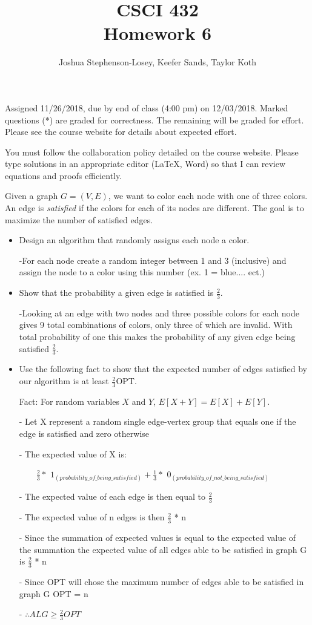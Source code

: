 \documentclass[12pt]{article}
\author{Joshua Stephenson-Losey,
Keefer Sands,
Taylor Koth}
\newenvironment{problem}[2][Problem]
{\begin{trivlist}
\item[\hskip \labelsep {\bfseries #1}\hskip \labelsep {\bfseries #2.}]}{\end{trivlist}}
\begin{document}
 
\title{CSCI 432\\Homework 6}
\date{}
\maketitle

Assigned 11/26/2018, due by end of class (4:00 pm) on 12/03/2018. Marked questions (*) are graded for correctness. The remaining will be graded for effort. Please see the course website for details about expected effort.

You must follow the collaboration policy detailed on the course website. Please type solutions in an appropriate editor (\LaTeX, Word) so that I can review equations and proofs efficiently. 

\begin{problem}{1*}
Given a graph $G=(V,E)$, we want to color each node with one of three colors. An edge is \textit{satisfied} if the colors for each of its nodes are different. The goal is to maximize the number of satisfied edges.

\begin{itemize}
\item Design an algorithm that randomly assigns each node a color.

-For each node create a random integer between 1 and 3 (inclusive) and assign the node to a color using this number (ex. 1 = blue.... ect.)

\item Show that the probability a given edge is satisfied is $\frac{2}{3}$.

-Looking at an edge with two nodes and three possible colors for each node gives 9 total combinations of colors, only three of which are invalid. With total probability of one this makes the probability of any given edge being satisfied $\frac{2}{3}$.

\item Use the following fact to show that the expected number of edges satisfied by our algorithm is at least $\frac{2}{3}$OPT. 

Fact: For random variables $X$ and $Y$, $E[X+Y] = E[X]+E[Y]$.

- Let X represent a random single edge-vertex group that equals one if the edge is satisfied and zero otherwise

- The expected value of X is:

$\qquad\frac{2}{3} *$
$1_{(probability\_of\_being\_satisfied)} + \frac{1}{3} *$
$0_{(probability\_of\_not\_being\_satisfied)}$

- The expected value of each edge is then equal to $\frac{2}{3}$

- The expected value of n edges is then $\frac{2}{3}$ * n

- Since the summation of expected values is equal to the expected value of the summation the expected value of all edges able to be satisfied in graph G is $\frac{2}{3}$ * n

- Since OPT will chose the maximum number of edges able to be satisfied in graph G OPT = n

- $\therefore ALG \ge \frac{2}{3} OPT$
\end{itemize}
\end{problem}
\end{document}
